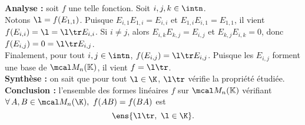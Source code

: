 \textbf{Analyse :} soit $f$ une telle fonction. Soit $i,j,k\in\intn$. \\
Notons $\l=f(E_{1,1})$. Puisque $E_{i,1}E_{1,i}=E_{i,i}$ et $E_{1,i}E_{i,1}=E_{1,1}$, il vient $f(E_{i,i})=\l=\l \tr E_{i,i}$.
Si $i\neq j$, alors $E_{i,k}E_{k,j}=E_{i,j}$ et $E_{k,j}E_{i,k}=0$, donc $f(E_{i,j})=0=\l \tr E_{i,j}$.\\
Finalement, pour tout $i,j\in\intn$, $f(E_{i,j})=\l \tr E_{i,j}$. Puisque les $E_{i,j}$ forment une base de $\mcal M_n(\mathbb K)$, il vient $f=\l\tr$.\\
\textbf{Synthèse :} on sait que pour tout $\l\in\K$, $\l \tr$ vérifie la propriété étudiée.\\
\textbf{Conclusion :} l'ensemble des formes linéaires $f$ sur $\mcal M_n(\mathbb K)$ vérifiant $\forall\,A,B \in \mcal M_n(\K),~ f(AB) = f(BA)$ est
$$\ens{\l \tr,\ \l\in\K}.$$

